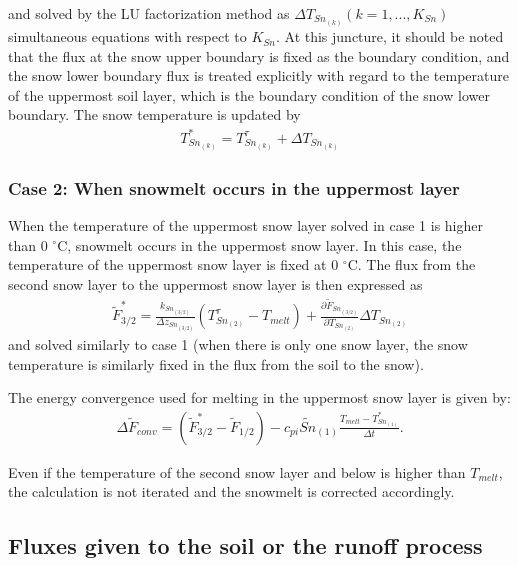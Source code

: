 and solved by the LU factorization method as \(\Delta T_{Sn_{(k)}} (k = 1, ..., K_{Sn})\) simultaneous equations with respect to \(K_{Sn}\). At this juncture, it should be noted that the flux at the
snow upper boundary is fixed as the boundary condition, and the snow lower boundary flux is treated explicitly with regard to the temperature of the uppermost soil layer, which is the boundary
condition of the snow lower boundary. The snow temperature is updated by \begin{eqnarray}
T_{Sn_{(k)}}^{\ast} = T_{Sn_{(k)}}^{\tau} + \Delta T_{Sn_{(k)}} \label{8-37}
\end{eqnarray}

\subsubsection{Case 2: When snowmelt occurs in the uppermost layer}\label{case-2-when-snowmelt-occurs-in-the-uppermost-layer}

When the temperature of the uppermost snow layer solved in case 1 is higher than 0 \(^\circ\mathrm{C}\), snowmelt occurs in the uppermost snow layer. In this case, the temperature of the uppermost
snow layer is fixed at 0 \(^\circ\mathrm{C}\). The flux from the second snow layer to the uppermost snow layer is then expressed as \begin{eqnarray}
\widetilde{F}_{3/2}^{\ast}
 = \frac{k_{Sn_{(3/2)}}}{\Delta z_{Sn_{(3/2)}}} (T_{Sn_{(2)}}^{\tau} - T_{melt})
 +\frac{\partial \widetilde{F}_{Sn_{(3/2)}}}{\partial T_{Sn_{(2)}}}
 \Delta T_{Sn_{(2)}} \label{8-38}
\end{eqnarray} and solved similarly to case 1 (when there is only one snow layer, the snow temperature is similarly fixed in the flux from the soil to the snow).

The energy convergence used for melting in the uppermost snow layer is given by: \begin{eqnarray}
\Delta \widetilde{F}_{conv}
 = (\widetilde{F}_{3/2}^{\ast} - \widetilde{F}_{1/2})
 - c_{pi}\widetilde{Sn}_{(1)} \frac{T_{melt}-T_{Sn_{(1)}}^{\ast}}{\Delta t}. \label{8-39}
\end{eqnarray}

Even if the temperature of the second snow layer and below is higher than \(T_{melt}\), the calculation is not iterated and the snowmelt is corrected accordingly.

\subsection{Fluxes given to the soil or the runoff process}\label{fluxes-given-to-the-soil-or-the-runoff-process}

